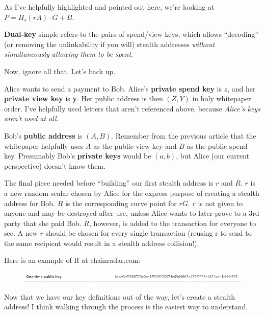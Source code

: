 As I've helpfully highlighted and pointed out here, we're looking at \(P = H_s(rA)\cdot G + B\).\par

\textbf{Dual-key} simple refers to the pairs of spend/view keys, which allows ``decoding'' (or removing the unlinkability if you will) stealth addresses \textit{without simultaneously allowing them to be spent}.\par

Now, ignore all that. Let's back up.\par

Alice wants to send a payment to Bob. Alice's \textbf{private spend key} is \(z\), and her \textbf{private view key} is \textbf{y}. Her public address is then \((Z, Y)\) in holy whitepaper order. I've helpfully used letters that aren't referenced above, because \emph{Alice's keys aren't used at all}.\par

Bob's \textbf{public address} is \((A, B)\). Remember from the previous article that the whitepaper helpfully uses \(A\) as the public view key and \(B\) as the public spend key. Presumably Bob's \textbf{private keys} would be \((a, b)\), but Alice (our current perspective) doesn't know them.\par

The final piece needed before ``building'' our first stealth address is \(r\) and \(R\). \(r\) is a new random scalar chosen by Alice for the express purpose of creating a stealth address for Bob. \(R\) is the corresponding curve point for \(rG\). \(r\) is not given to anyone and may be destroyed after use, unless Alice wants to later prove to a 3rd party that she paid Bob. \(R\), however, is added to the transaction for everyone to see. A new \(r\) should be chosen for every single transaction (reusing r to send to the same recipient would result in a stealth address collision!).\par

Here is an example of R at chainradar.com:
\begin{figure}[H]
	\centering
	\includegraphics[width=0.8\linewidth]{./images/blog-series/xmr-crypto-luigi1111/R-from-chainradar.png}
\end{figure}

Now that we have our key definitions out of the way, let's create a stealth address! I think walking through the process is the easiest way to understand.\par

